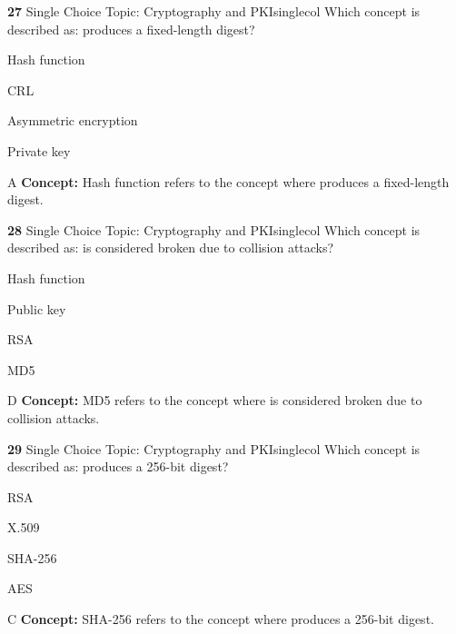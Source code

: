 \documentclass[10pt,a4paper]{article}
\begin{document}
\begin{qcard}{\color{white}\textbf{27} \hfill \small Single Choice \textbar{} Topic: Cryptography and PKI}{singlecol}
Which concept is described as: produces a fixed-length digest?

\begin{qoptions}
\item Hash function
\item CRL
\item Asymmetric encryption
\item Private key
\end{qoptions}
\begin{explainbox}{A}
\textbf{Concept:} Hash function refers to the concept where produces a fixed-length digest.
\end{explainbox}
\end{qcard}

\begin{qcard}{\color{white}\textbf{28} \hfill \small Single Choice \textbar{} Topic: Cryptography and PKI}{singlecol}
Which concept is described as: is considered broken due to collision attacks?

\begin{qoptions}
\item Hash function
\item Public key
\item RSA
\item MD5
\end{qoptions}
\begin{explainbox}{D}
\textbf{Concept:} MD5 refers to the concept where is considered broken due to collision attacks.
\end{explainbox}
\end{qcard}

\begin{qcard}{\color{white}\textbf{29} \hfill \small Single Choice \textbar{} Topic: Cryptography and PKI}{singlecol}
Which concept is described as: produces a 256-bit digest?

\begin{qoptions}
\item RSA
\item X.509
\item SHA-256
\item AES
\end{qoptions}
\begin{explainbox}{C}
\textbf{Concept:} SHA-256 refers to the concept where produces a 256-bit digest.
\end{explainbox}
\end{qcard}
\end{document}
